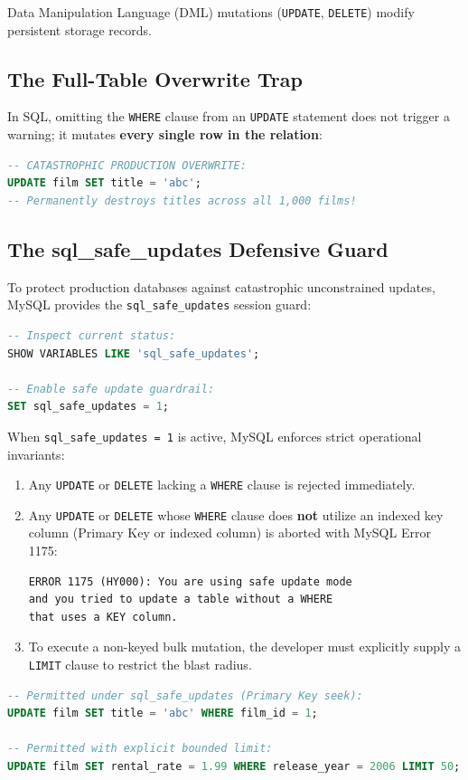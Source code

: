 \documentclass[10pt,twocolumn,letterpaper]{article}
\begin{document}
Data Manipulation Language (DML) mutations (\texttt{UPDATE}, \texttt{DELETE}) modify persistent storage records. 

\subsection{The Full-Table Overwrite Trap}
In SQL, omitting the \texttt{WHERE} clause from an \texttt{UPDATE} statement does not trigger a warning; it mutates \textbf{every single row in the relation}:
\begin{lstlisting}[language=SQL]
-- CATASTROPHIC PRODUCTION OVERWRITE:
UPDATE film SET title = 'abc';
-- Permanently destroys titles across all 1,000 films!
\end{lstlisting}

\subsection{The sql\_safe\_updates Defensive Guard}
To protect production databases against catastrophic unconstrained updates, MySQL provides the \texttt{sql\_safe\_updates} session guard:
\begin{lstlisting}[language=SQL]
-- Inspect current status:
SHOW VARIABLES LIKE 'sql_safe_updates';

-- Enable safe update guardrail:
SET sql_safe_updates = 1;
\end{lstlisting}

When \texttt{sql\_safe\_updates = 1} is active, MySQL enforces strict operational invariants:
\begin{enumerate}
    \item Any \texttt{UPDATE} or \texttt{DELETE} lacking a \texttt{WHERE} clause is rejected immediately.
    \item Any \texttt{UPDATE} or \texttt{DELETE} whose \texttt{WHERE} clause does \textbf{not} utilize an indexed key column (Primary Key or indexed column) is aborted with MySQL Error 1175:
    \begin{lstlisting}[basicstyle=\ttfamily\scriptsize]
ERROR 1175 (HY000): You are using safe update mode 
and you tried to update a table without a WHERE 
that uses a KEY column.
    \end{lstlisting}
    \item To execute a non-keyed bulk mutation, the developer must explicitly supply a \texttt{LIMIT} clause to restrict the blast radius.
\end{enumerate}

\begin{lstlisting}[language=SQL]
-- Permitted under sql_safe_updates (Primary Key seek):
UPDATE film SET title = 'abc' WHERE film_id = 1;

-- Permitted with explicit bounded limit:
UPDATE film SET rental_rate = 1.99 WHERE release_year = 2006 LIMIT 50;
\end{lstlisting}
\end{document}
